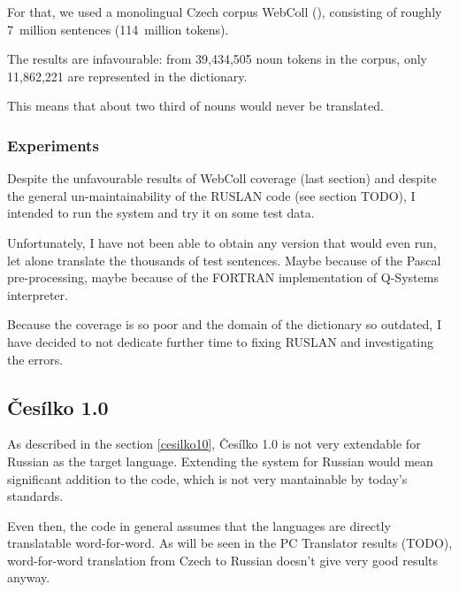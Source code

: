 For that, we used a monolingual Czech corpus WebColl (\cite{webcoll}), consisting of roughly 7~million sentences (114~million tokens).


The results are infavourable: from 39,434,505 noun tokens in the corpus, only 11,862,221 are represented in the dictionary.

This means that about two third of nouns would never be translated.

\subsubsection{Experiments}

Despite the unfavourable results of WebColl coverage (last section) and despite the  general un-maintainability of the RUSLAN code (see section TODO), I intended to run the system and try it on some test data.

Unfortunately, I have not been able to obtain any version that would even run, let alone translate the thousands of test sentences. Maybe because of the Pascal pre-processing, maybe because of the FORTRAN implementation of Q-Systems interpreter.

Because the coverage is so poor and the domain of the dictionary so outdated, I have decided to not dedicate further time to fixing RUSLAN and investigating the errors.

\subsection{Česílko 1.0}


As described in the section \ref{cesilko10}, Česílko 1.0 is not very extendable for Russian as the target language. Extending the system for Russian would mean significant addition to the code, which is not very mantainable by today's standards. 

Even then, the code in general assumes that the languages are directly translatable word-for-word. As will be seen in the PC Translator results (TODO), word-for-word translation from Czech to Russian doesn't give very good results anyway.

